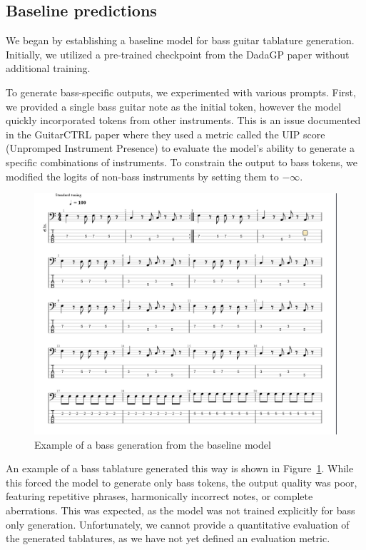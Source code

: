 \subsection{Baseline predictions}

We began by establishing a baseline model for bass guitar tablature generation.
Initially, we utilized a pre-trained checkpoint from the DadaGP paper \cite{sarmento_dadagp_2021} without additional training.

To generate bass-specific outputs, we experimented with various prompts.
First, we provided a single bass guitar note as the initial token, however the model quickly incorporated tokens from other instruments.
This is an issue documented in the GuitarCTRL paper\cite{sarmento_gtr-ctrl_2023} where they used a metric called the UIP score (Unpromped Instrument Presence) to evaluate the model's ability to generate a specific combinations of instruments.
To constrain the output to bass tokens, we modified the logits of non-bass instruments by setting them to $-\infty$.

\begin{figure}[!ht]
    \centering
    \includegraphics[width=.75\linewidth]{../images-figures/generated_bass_baseline.png}
    \caption{Example of a bass generation from the baseline model}
    \label{fig:repetitive_generation}
\end{figure}

An example of a bass tablature generated this way is shown in Figure~\ref{fig:repetitive_generation}.
While this forced the model to generate only bass tokens, the output quality was poor, featuring repetitive phrases, harmonically incorrect notes, or complete aberrations.
This was expected, as the model was not trained explicitly for bass only generation. 
Unfortunately, we cannot provide a quantitative evaluation of the generated tablatures, as we have not yet defined an evaluation metric.

